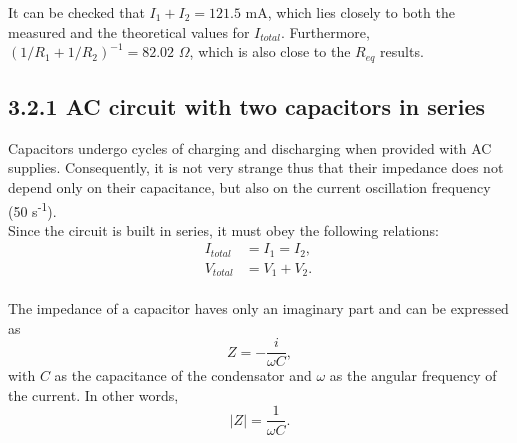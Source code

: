 \documentclass[a4paper, 12pt]{article}
\begin{document}
It can be checked that $I_1 + I_2 = 121.5 $ mA, which lies closely to both the measured and the theoretical values for $I_{total}$. Furthermore, $(1/R_{1} + 1/R_2)^{-1} = 82.02$ $\Omega$, which is also close to the $R_{eq}$ results.

\newpage
\subsection{3.2.1 AC circuit with two capacitors in series}
Capacitors undergo cycles of charging and discharging when provided with AC supplies. Consequently, it is not very strange thus that their impedance does not depend only on their capacitance, but also on the current oscillation frequency (50 s\textsuperscript{-1}). \\

Since the circuit is built in series, it must obey the following relations:
\begin{align*}
	I_{total} &= I_1 = I_2, \\
	V_{total} &= V_1 + V_2.\
\end{align*}\\

The impedance of a capacitor haves only an imaginary part and can be expressed as
\begin{equation}\label{capz}
	Z = -\frac{i}{\omega C},
\end{equation}
with $C$ as the capacitance of the condensator and $\omega$ as the angular frequency of the current. In other words,
\begin{equation}\label{capzabs}
	|Z| = \frac{1}{\omega C}.
\end{equation}\\
\end{document}
